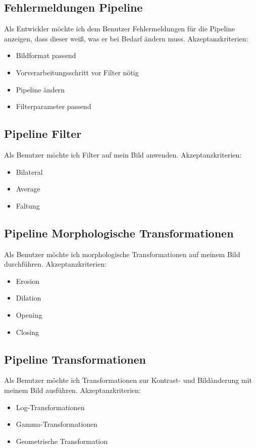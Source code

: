 \documentclass[conference]{IEEEtran}
\begin{document}
\subsection{Fehlermeldungen Pipeline}
Als Entwickler möchte ich dem Benutzer Fehlermeldungen für die Pipeline anzeigen, dass dieser weiß, was er bei Bedarf ändern muss. 
Akzeptanzkriterien: 
\begin{itemize}
	\item Bildformat passend
	\item Vorverarbeitungsschritt vor Filter nötig
	\item Pipeline ändern
	\item Filterparameter passend
\end{itemize}

\subsection{Pipeline Filter}
Als Benutzer möchte ich Filter auf mein Bild anwenden.
Akzeptanzkriterien:
\begin{itemize}
	\item Bilateral
	\item Average
	\item Faltung
\end{itemize}

\subsection{Pipeline Morphologische Transformationen}
Als Benutzer möchte ich morphologische Transformationen auf meinem Bild durchführen.
Akzeptanzkriterien:
\begin{itemize}
	\item Erosion
	\item Dilation
	\item Opening
	\item Closing
\end{itemize}

\subsection{Pipeline Transformationen}
Als Benutzer möchte ich Transformationen zur Kontrast- und Bildänderung mit meinem Bild ausführen.
Akzeptanzkriterien:
\begin{itemize}
	\item Log-Transformationen
	\item Gamma-Transformationen
	\item Geometrische Transformation
\end{itemize}
\end{document}
